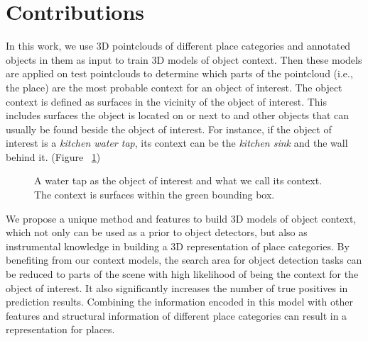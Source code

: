 % 
%     
     
     
\section {Contributions}
\label{Contributions.sec}
In this work, we use 3D pointclouds of different place categories and annotated objects in them as input to train 3D models of object context. Then these models are applied on test pointclouds to determine which parts of the pointcloud (i.e., the place) are the most probable context for an object of interest. The object context is defined as surfaces in the vicinity of the object of interest. This includes surfaces the object is located on or next to and other objects that can usually be found beside the object of interest. 
For instance, if the object of interest is a \textit{kitchen water tap}, its context can be the 
\textit{kitchen sink} and the wall behind it. (Figure ~\ref{contextExample.figure})

\begin{figure}[t]
  \caption[Illustration of a sample Context.]
  {A water tap as the object of interest and what we call its context. The context is surfaces within the green 
  bounding box.}
  \label{contextExample.figure}
\end{figure}

We propose a unique method and features to build 3D models of object context, which not only can be used as a prior to 
object detectors, but also as instrumental knowledge in building a 3D representation of place categories. 
By benefiting from our context models, the search area for object detection tasks can be reduced to parts of the scene with high 
likelihood of being the context for the object of interest. 
It also significantly increases the number of true positives in prediction results. 
Combining the information encoded in this model with other features and structural information of different place categories can 
result in a representation for places.
 
